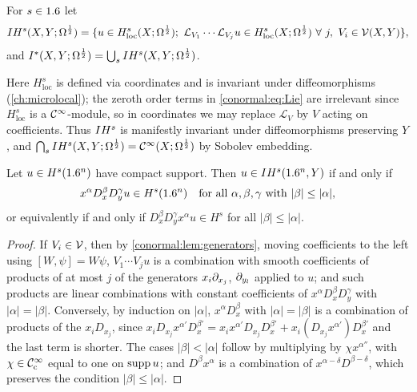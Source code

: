 \begin{definition}\label{conormal:def:IH}
  For $s\in1.6$ let
  \begin{equation*}
    IH^{s}(X,Y;\Omega^{\frac12})=\{u\in H^s_{\mathrm{loc}}(X;\Omega^{\frac12});\
    \mathcal L_{V_1}\cdots\mathcal L_{V_j}u\in H^s_{\mathrm{loc}}(X;\Omega^{\frac12})\
    \forall\ j,\ V_i\in\mathcal{V}(X,Y)\},
  \end{equation*}
  and $I^{*}(X,Y;\Omega^{\frac12})=\bigcup_sIH^{s}(X,Y;\Omega^{\frac12})$.
\end{definition}
Here $H^s_{\mathrm{loc}}$ is defined via coordinates and is invariant under
diffeomorphisms (\cref{ch:microlocal}); the zeroth order terms in
\eqref{conormal:eq:Lie} are irrelevant since $H^s_{\mathrm{loc}}$ is a
$\mathcal{C}^\infty$-module, so in coordinates we may replace $\mathcal L_V$ by $V$ acting on
coefficients.  Thus $IH^{s}$ is manifestly invariant under diffeomorphisms
preserving $Y$, and $\bigcap_sIH^{s}(X,Y;\Omega^{\frac12})=\mathcal{C}^\infty(X;\Omega^{\frac12})$ by Sobolev
embedding.

\begin{lemma}\label{conormal:lem:IH-local}
  Let $u\in H^s(1.6^n)$ have compact support.  Then $u\in IH^{s}(1.6^n,Y)$ if and
  only if
  \begin{equation}\label{conormal:eq:IH-local}
    x^\alpha D_x^\beta D_y^\gamma u\in H^s(1.6^n)\quad\text{for all }
    \alpha,\beta,\gamma\text{ with }|\beta|\le|\alpha|,
  \end{equation}
  or equivalently if and only if $D_x^\beta D_y^\gamma x^\alpha u\in H^s$ for
  all $|\beta|\le|\alpha|$.
\end{lemma}
\begin{proof}
  If $V_i\in\mathcal{V}$, then by \cref{conormal:lem:generators}, moving coefficients to
  the left using $[W,\psi]=W\psi$, $V_1\cdots V_ju$ is a combination with smooth
  coefficients of products of at most $j$ of the generators $x_i\partial_{x_j}$,
  $\partial_{y_l}$ applied to $u$; and such products are linear combinations with
  constant coefficients of $x^\alpha D_x^\beta D_y^\gamma$ with $|\alpha|=|\beta|$.
  Conversely, by induction on $|\alpha|$, $x^\alpha D_x^\beta$ with
  $|\alpha|=|\beta|$ is a combination of products of the $x_iD_{x_j}$, since
  $x_iD_{x_j}x^{\alpha'}D_x^{\beta'}=x_ix^{\alpha'}D_{x_j}D_x^{\beta'}+
  x_i(D_{x_j}x^{\alpha'})D_x^{\beta'}$ and the last term is shorter.  The cases
  $|\beta|<|\alpha|$ follow by multiplying by $\chi x^{\alpha''}$, with
  $\chi\in\mathcal{C}^\infty_{\mathrm{c}}$ equal to one on $\operatorname{supp} u$; and $D^\beta x^\alpha$ is a
  combination of $x^{\alpha-\delta}D^{\beta-\delta}$, which preserves the
  condition $|\beta|\le|\alpha|$.
\end{proof}

